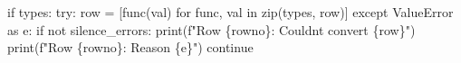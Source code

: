 \documentclass[
  letterpaper,
  DIV=11,
  numbers=noendperiod]{scrreprt}
\newenvironment{Shaded}{\begin{snugshade}}{\end{snugshade}}
\newcommand{\BuiltInTok}[1]{\textcolor[rgb]{0.00,0.46,0.62}{#1}}
\newcommand{\ControlFlowTok}[1]{\textcolor[rgb]{0.00,0.46,0.62}{#1}}
\newcommand{\ImportTok}[1]{\textcolor[rgb]{0.00,0.46,0.62}{#1}}
\newcommand{\KeywordTok}[1]{\textcolor[rgb]{0.00,0.46,0.62}{#1}}
\newcommand{\NormalTok}[1]{\textcolor[rgb]{0.00,0.46,0.62}{#1}}
\newcommand{\OperatorTok}[1]{\textcolor[rgb]{0.37,0.37,0.37}{#1}}
\newcommand{\PreprocessorTok}[1]{\textcolor[rgb]{0.68,0.00,0.00}{#1}}
\newcommand{\SpecialCharTok}[1]{\textcolor[rgb]{0.37,0.37,0.37}{#1}}
\newcommand{\SpecialStringTok}[1]{\textcolor[rgb]{0.13,0.47,0.30}{#1}}
\begin{document}
\begin{Shaded}
\begin{Highlighting}[]
        \ControlFlowTok{if}\NormalTok{ types:}
                \ControlFlowTok{try}\NormalTok{:}
\NormalTok{                    row }\OperatorTok{=}\NormalTok{ [func(val) }\ControlFlowTok{for}\NormalTok{ func, val }\KeywordTok{in} \BuiltInTok{zip}\NormalTok{(types, row)]}
                \ControlFlowTok{except} \PreprocessorTok{ValueError} \ImportTok{as}\NormalTok{ e:}
                    \ControlFlowTok{if} \KeywordTok{not}\NormalTok{ silence\_errors:}
                        \BuiltInTok{print}\NormalTok{(}\SpecialStringTok{f"Row }\SpecialCharTok{\{}\NormalTok{rowno}\SpecialCharTok{\}}\SpecialStringTok{: Couldn\textquotesingle{}t convert }\SpecialCharTok{\{}\NormalTok{row}\SpecialCharTok{\}}\SpecialStringTok{"}\NormalTok{)}
                        \BuiltInTok{print}\NormalTok{(}\SpecialStringTok{f"Row }\SpecialCharTok{\{}\NormalTok{rowno}\SpecialCharTok{\}}\SpecialStringTok{: Reason }\SpecialCharTok{\{}\NormalTok{e}\SpecialCharTok{\}}\SpecialStringTok{"}\NormalTok{)}
                    \ControlFlowTok{continue}
\end{Highlighting}
\end{Shaded}
\end{document}
